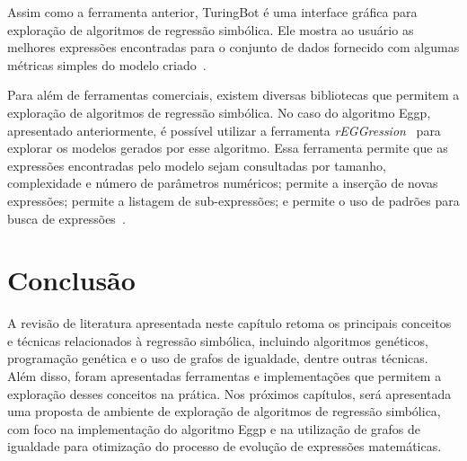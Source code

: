 Assim como a ferramenta anterior, TuringBot é uma interface gráfica para exploração de algoritmos de regressão simbólica. Ele mostra ao usuário as melhores expressões encontradas para o conjunto de dados fornecido com algumas métricas simples do modelo criado~\cite{rEGGression}.

Para além de ferramentas comerciais, existem diversas bibliotecas que permitem a exploração de algoritmos de regressão simbólica. No caso do algoritmo Eggp, apresentado anteriormente, é possível utilizar a ferramenta \textit{rEGGression}~\cite{rEGGression} para explorar os modelos gerados por esse algoritmo. Essa ferramenta permite que as expressões encontradas pelo modelo sejam consultadas por tamanho, complexidade e número de parâmetros numéricos; permite a inserção de novas expressões; permite a listagem de sub-expressões; e permite o uso de padrões para busca de expressões~\cite{rEGGression}.

\section{Conclusão}

A revisão de literatura apresentada neste capítulo retoma os principais conceitos e técnicas relacionados à regressão simbólica, incluindo algoritmos genéticos, programação genética e o uso de grafos de igualdade, dentre outras técnicas. Além disso, foram apresentadas ferramentas e implementações que permitem a exploração desses conceitos na prática. Nos próximos capítulos, será apresentada uma proposta de ambiente de exploração de algoritmos de regressão simbólica, com foco na implementação do algoritmo Eggp e na utilização de grafos de igualdade para otimização do processo de evolução de expressões matemáticas.
